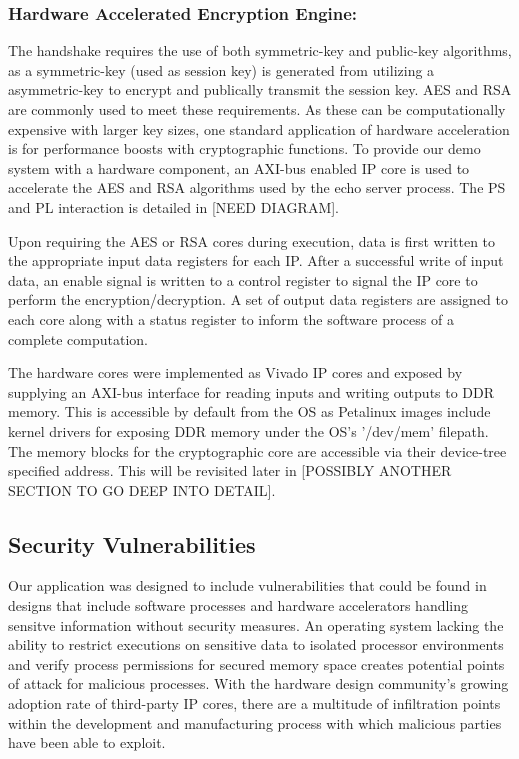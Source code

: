 \documentclass[sigconf]{acmart}
\theoremstyle{plain}
\theoremstyle{remark}
\begin{document}
\subsubsection{Hardware Accelerated Encryption Engine:}
The handshake requires the use of both symmetric-key and public-key algorithms, as a symmetric-key (used as session key) is generated from utilizing a asymmetric-key to encrypt and publically transmit the session key. AES and RSA are commonly used to meet these requirements. As these can be computationally expensive with larger key sizes, one standard application of hardware acceleration is for performance boosts with cryptographic functions. To provide our demo system with a hardware component, an AXI-bus enabled IP core is used to accelerate the AES and RSA algorithms used by the echo server process. The PS and PL interaction is detailed in [NEED DIAGRAM].

Upon requiring the AES or RSA cores during execution, data is first written to the appropriate input data registers for each IP. After a successful write of input data, an enable signal is written to a control register to signal the IP core to perform the encryption/decryption. A set of output data registers are assigned to each core along with a status register to inform the software process of a complete computation.

The hardware cores were implemented as Vivado IP cores and exposed by supplying an AXI-bus interface for reading inputs and writing outputs to DDR memory. This is accessible by default from the OS as Petalinux images include kernel drivers for exposing DDR memory under the OS's '/dev/mem' filepath. The memory blocks for the cryptographic core are accessible via their device-tree specified address. This will be revisited later in [POSSIBLY ANOTHER SECTION TO GO DEEP INTO DETAIL].




\subsection{Security Vulnerabilities}

Our application was designed to include vulnerabilities that could be found in designs that include software processes and hardware accelerators handling sensitve information without security measures. An operating system lacking the ability to restrict executions on sensitive data to isolated processor environments and verify process permissions for secured memory space creates potential points of attack for malicious processes. With the hardware design community's growing adoption rate of third-party IP cores, there are a multitude of infiltration points within the development and manufacturing process with which malicious parties have been able to exploit.
\end{document}
